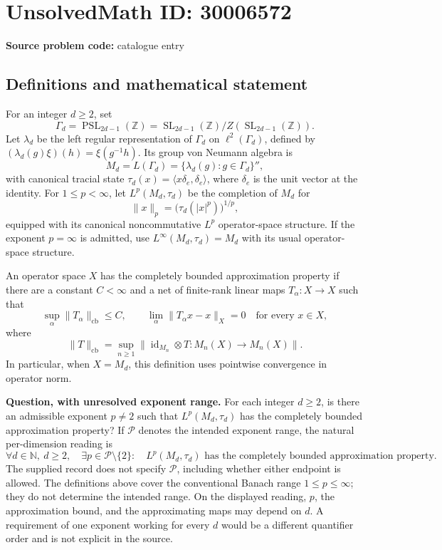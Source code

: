 \documentclass[11pt]{article}
\newcommand{\N}{\mathbb{N}}
\newcommand{\Z}{\mathbb{Z}}
\begin{document}
\section*{UnsolvedMath ID: 30006572}
\textbf{Source problem code:} catalogue entry
\subsection{Definitions and mathematical statement}
For an integer \(d\geq 2\), set
\[
\Gamma_d=\operatorname{PSL}_{2d-1}(\Z)
=\operatorname{SL}_{2d-1}(\Z)/Z(\operatorname{SL}_{2d-1}(\Z)).
\]
Let \(\lambda_d\) be the left regular representation of \(\Gamma_d\) on \(\ell^2(\Gamma_d)\), defined by \((\lambda_d(g)\xi)(h)=\xi(g^{-1}h)\). Its group von Neumann algebra is
\[
M_d=L(\Gamma_d)=\{\lambda_d(g):g\in\Gamma_d\}'',
\]
with canonical tracial state \(\tau_d(x)=\langle x\delta_e,\delta_e\rangle\), where \(\delta_e\) is the unit vector at the identity. For \(1\leq p<\infty\), let \(L^p(M_d,\tau_d)\) be the completion of \(M_d\) for
\[
\|x\|_p=\bigl(\tau_d(|x|^p)\bigr)^{1/p},
\]
equipped with its canonical noncommutative \(L^p\) operator-space structure. If the exponent \(p=\infty\) is admitted, use \(L^\infty(M_d,\tau_d)=M_d\) with its usual operator-space structure.

An operator space \(X\) has the completely bounded approximation property if there are a constant \(C<\infty\) and a net of finite-rank linear maps \(T_\alpha:X\to X\) such that
\[
\sup_\alpha\|T_\alpha\|_{\mathrm{cb}}\leq C,
\qquad
\lim_\alpha\|T_\alpha x-x\|_X=0
\quad\text{for every }x\in X,
\]
where
\[
\|T\|_{\mathrm{cb}}
=\sup_{n\geq1}\|\operatorname{id}_{M_n}\otimes T:M_n(X)\to M_n(X)\|.
\]
In particular, when \(X=M_d\), this definition uses pointwise convergence in operator norm.

\textbf{Question, with unresolved exponent range.} For each integer \(d\geq2\), is there an admissible exponent \(p\neq2\) such that \(L^p(M_d,\tau_d)\) has the completely bounded approximation property? If \(\mathcal P\) denotes the intended exponent range, the natural per-dimension reading is
\[
\forall d\in\N,\ d\geq2,\quad
\exists p\in\mathcal P\setminus\{2\}:\quad
L^p(M_d,\tau_d)\text{ has the completely bounded approximation property}.
\]
The supplied record does not specify \(\mathcal P\), including whether either endpoint is allowed. The definitions above cover the conventional Banach range \(1\leq p\leq\infty\); they do not determine the intended range. On the displayed reading, \(p\), the approximation bound, and the approximating maps may depend on \(d\). A requirement of one exponent working for every \(d\) would be a different quantifier order and is not explicit in the source.
\end{document}
